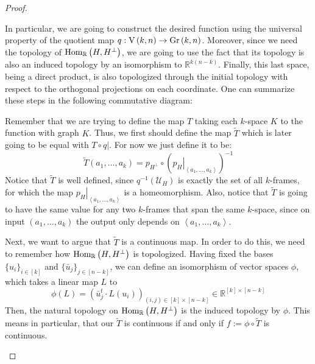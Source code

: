 \begin{proof}
\begin{b_item}
In particular, we are going to construct the desired function using the universal property of the quotient map $q:\St{k}{n}\to\Gr{k}{n}$. Moreover, since we need the topology of $\mathrm{Hom}_{\mathbb{R}}\left(H,H^{\perp}\right)$, we are going to use the fact that its topology is also an induced topology by an isomorphism to $\mathbb{R}^{k(n-k)}$. Finally, this last space, being a direct product, is also topologized through the initial topology with respect to the orthogonal projections on each coordinate. One can summarize these steps in the following commutative diagram:
\begin{center}
\end{center}
Remember that we are trying to define the map $T$ taking each $k$-space $K$ to the function with graph $K$. Thus, we first should define the map $\tilde T$ which is later going to be equal with $T\circ\left.q\right|$. For now we just define it to be:
$$\tilde T(a_1,\ldots,a_k)=p_{H^{\perp}}\circ\left(\left.p_H\right|_{\left<a_1,\ldots,a_k\right>}\right)^{-1}$$
Notice that $\tilde T$ is well defined, since $q^{-1}\left(\mathcal{U}_H\right)$ is exactly the set of all $k$-frames, for which the map $\left.p_H\right|_{\left<a_1,\ldots,a_k\right>}$ is a homeomorphism. Also, notice that $\tilde T$ is going to have the same value for any two $k$-frames that span the same $k$-space, since on input $(a_1,\ldots,a_k)$ the output only depends on $\left<a_1,\ldots,a_k\right>$.

Next, we want to argue that $\tilde T$ is a continuous map. In order to do this, we need to remember how $\mathrm{Hom}_{\mathbb{R}}\left(H,H^{\perp}\right)$ is topologized. Having fixed the bases $\{u_i\}_{i\in[k]}$ and $\{\bar{u}_j\}_{j\in[n-k]}$, we can define an isomorphism of vector spaces $\phi$, which takes a linear map $L$ to
$$\phi(L)=\left(\bar{u}_j^t\cdot L(u_i)\right)_{(i,j)\in[k]\times[n-k]}\in\mathbb{R}^{[k]\times[n-k]}$$
Then, the natural topology on $\mathrm{Hom}_{\mathbb{R}}\left(H,H^{\perp}\right)$ is the induced topology by $\phi$. This means in particular, that our $\tilde T$ is continuous if and only if $f:=\phi\circ\tilde T$ is continuous.


\end{b_item}
\end{proof}

